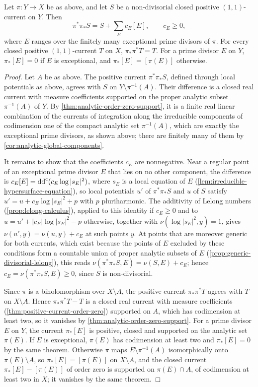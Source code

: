 \begin{lemma}\label{lem:nondivisorial-pull-push-exceptional}
Let $\pi\colon Y\to X$ be as above, and let $S$ be a non-divisorial closed positive $(1,1)$-current on $Y$. Then
\[
 \pi^*\pi_*S=S+\sum_E c_E[E],\qquad c_E\geq0,
\]
where $E$ ranges over the finitely many exceptional prime divisors of $\pi$. For every closed positive $(1,1)$-current $T$ on $X$, $\pi_*\pi^*T=T$. For a prime divisor $E$ on $Y$, $\pi_*[E]=0$ if $E$ is exceptional, and $\pi_*[E]=[\pi(E)]$ otherwise.
\end{lemma}
\begin{proof}
Let $A$ be as above. The positive current $\pi^*\pi_*S$, defined through local potentials as above, agrees with $S$ on $Y\setminus\pi^{-1}(A)$. Their difference is a closed real current with measure coefficients supported on the proper analytic subset $\pi^{-1}(A)$ of $Y$. By \cref{thm:analytic-order-zero-support}, it is a finite real linear combination of the currents of integration along the irreducible components of codimension one of the compact analytic set $\pi^{-1}(A)$, which are exactly the exceptional prime divisors, as shown above; there are finitely many of them by \cref{cor:analytic-global-components}.

It remains to show that the coefficients $c_E$ are nonnegative. Near a regular point of an exceptional prime divisor $E$ that lies on no other component, the difference is $c_E[E]=\mathrm{dd}^{\mathrm{c}}(c_E\log|s_E|^2)$, where $s_E$ is a local equation of $E$ (\cref{lem:irreducible-hypersurface-equation}), so local potentials $u'$ of $\pi^*\pi_*S$ and $u$ of $S$ satisfy $u'=u+c_E\log|s_E|^2+p$ with $p$ pluriharmonic. The additivity of Lelong numbers (\cref{prop:lelong-calculus}), applied to this identity if $c_E\geq0$ and to $u=u'+|c_E|\log|s_E|^2-p$ otherwise, together with $\nu(\log|s_E|^2,y)=1$, gives $\nu(u',y)=\nu(u,y)+c_E$ at such points $y$. At points that are moreover generic for both currents, which exist because the points of $E$ excluded by these conditions form a countable union of proper analytic subsets of $E$ (\cref{prop:generic-divisorial-lelong}), this reads $\nu(\pi^*\pi_*S,E)=\nu(S,E)+c_E$; hence $c_E=\nu(\pi^*\pi_*S,E)\geq0$, since $S$ is non-divisorial.

Since $\pi$ is a biholomorphism over $X\setminus A$, the positive current $\pi_*\pi^*T$ agrees with $T$ on $X\setminus A$. Hence $\pi_*\pi^*T-T$ is a closed real current with measure coefficients (\cref{thm:positive-current-order-zero}) supported on $A$, which has codimension at least two, so it vanishes by \cref{thm:analytic-order-zero-support}. For a prime divisor $E$ on $Y$, the current $\pi_*[E]$ is positive, closed and supported on the analytic set $\pi(E)$. If $E$ is exceptional, $\pi(E)$ has codimension at least two and $\pi_*[E]=0$ by the same theorem. Otherwise $\pi$ maps $E\setminus\pi^{-1}(A)$ isomorphically onto $\pi(E)\setminus A$, so $\pi_*[E]=[\pi(E)]$ on $X\setminus A$, and the closed current $\pi_*[E]-[\pi(E)]$ of order zero is supported on $\pi(E)\cap A$, of codimension at least two in $X$; it vanishes by the same theorem.
\end{proof}


